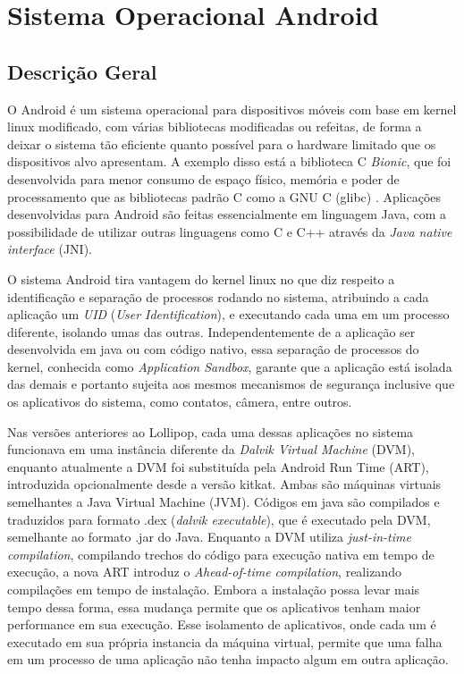 \chapter[Sistema Operacional Android]{Sistema Operacional Android\footnotemark}
\label{cap:android-os}

\section{Descrição Geral}

O Android é um sistema operacional para dispositivos móveis com base em kernel linux modificado, com várias bibliotecas modificadas ou refeitas, de forma a deixar o sistema tão eficiente quanto possível para o hardware limitado que os dispositivos alvo apresentam. A exemplo disso está a biblioteca C \textit{Bionic}, que foi desenvolvida para menor consumo de espaço físico, memória e poder de processamento que as bibliotecas padrão C como a GNU C (glibc) \cite{devos2014}. Aplicações desenvolvidas para Android são feitas essencialmente em linguagem Java, com a possibilidade de utilizar outras linguagens como C e C++ através da \textit{Java native interface} (JNI). 

O sistema Android tira vantagem do kernel linux no que diz respeito a identificação e separação de processos rodando no sistema, atribuindo a cada aplicação um \textit{UID} (\textit{User Identification}), e executando cada uma em um processo diferente, isolando umas das outras.  Independentemente de a aplicação ser desenvolvida em java ou com código nativo, essa separação de processos do kernel, conhecida como \textit{Application Sandbox}, garante que a aplicação está isolada das demais e portanto sujeita aos mesmos mecanismos de segurança inclusive que os aplicativos do sistema, como contatos, câmera, entre outros. 

Nas versões anteriores ao Lollipop, cada uma dessas aplicações no sistema funcionava em uma instância diferente da \textit{Dalvik Virtual Machine} (DVM), enquanto atualmente a DVM foi substituída pela Android Run Time (ART), introduzida opcionalmente desde a versão kitkat. Ambas são máquinas virtuais semelhantes a Java Virtual Machine (JVM). Códigos em java são compilados e traduzidos para formato .dex (\textit{dalvik executable}), que é executado pela DVM, semelhante ao formato .jar do Java. Enquanto a DVM utiliza \textit{just-in-time compilation}, compilando trechos do código para execução nativa em tempo de execução, a nova ART introduz o \textit{Ahead-of-time compilation}, realizando compilações em tempo de instalação. Embora a instalação possa levar mais tempo dessa forma, essa mudança permite que os aplicativos tenham maior performance em sua execução. Esse isolamento de aplicativos, onde cada um é executado em sua própria instancia da máquina virtual, permite que uma falha em um processo de uma aplicação não tenha impacto algum em outra aplicação.  

